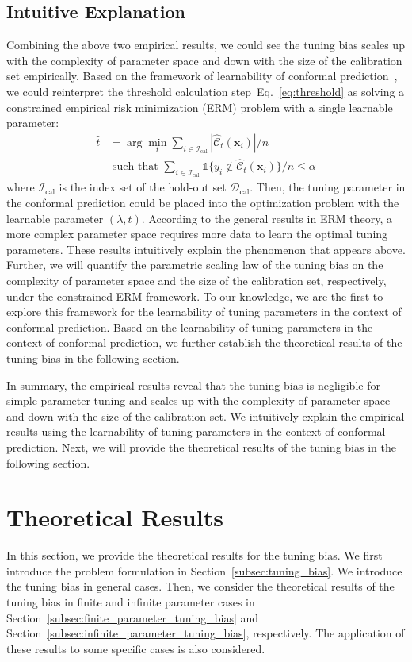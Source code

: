 \documentclass{article}
\newcommand{\C}{\mathcal{C}}
\newcommand{\1}{\mathbbm{1}}
\newcommand{\Eqref}[1]{Eq.~\eqref{#1}}
\newcommand{\id}[1]{\mathds{1}\{#1\}}
\theoremstyle{plain}
\theoremstyle{definition}
\theoremstyle{remark}
\begin{document}
\subsection{Intuitive Explanation}
\label{subsec:intuitive_explanation}
Combining the above two empirical results, we could see the tuning bias scales up with the complexity of parameter space and down with the size of the calibration set empirically.
Based on the framework of learnability of conformal prediction~\citep{gupta2022nested,bai2022efficient}, we could reinterpret the threshold calculation step~\Eqref{eq:threshold} as solving a constrained empirical risk minimization (ERM) problem with a single learnable parameter: 
\begin{align*}
    \hat{t} & = \arg\min_{t} \sum_{i\in\mathcal{I}_{\text{cal}}}|\widehat{\C}_{t}(\boldsymbol{x}_i)|/n  \\ 
    & \text{ such that } \sum_{i \in \mathcal{I}_{\text{cal}}} \id{ y_i \notin \widehat{\C}_{t}(\boldsymbol{x}_i)}/n \leq \alpha
\end{align*}
where $\mathcal{I}_{\text{cal}}$ is the index set of the hold-out set $\mathcal{D}_{\text{cal}}$.
Then, the tuning parameter in the conformal prediction could be placed into the optimization problem with the learnable parameter \((\lambda, t)\). 
According to the general results in ERM theory, a more complex parameter space requires more data to learn the optimal tuning parameters. 
These results intuitively explain the phenomenon that appears above. 
Further, we will quantify the parametric scaling law of the tuning bias on the complexity of parameter space and the size of the calibration set, respectively, under the constrained ERM framework.
To our knowledge, we are the first to explore this framework for the learnability of tuning parameters in the context of conformal prediction.
Based on the learnability of tuning parameters in the context of conformal prediction, we further establish the theoretical results of the tuning bias in the following section.

In summary, the empirical results reveal that the tuning bias is negligible for simple parameter tuning and scales up with the complexity of parameter space and down with the size of the calibration set. 
We intuitively explain the empirical results using the learnability of tuning parameters in the context of conformal prediction.
Next, we will provide the theoretical results of the tuning bias in the following section.

\section{Theoretical Results}
\label{sec:theoretical_results}
In this section, we provide the theoretical results for the tuning bias. 
We first introduce the problem formulation in Section~\ref{subsec:tuning_bias}. 
We introduce the tuning bias in general cases. 
Then, we consider the theoretical results of the tuning bias in finite and infinite parameter cases in Section~\ref{subsec:finite_parameter_tuning_bias} and Section~\ref{subsec:infinite_parameter_tuning_bias}, respectively. 
The application of these results to some specific cases is also considered. 
\end{document}
